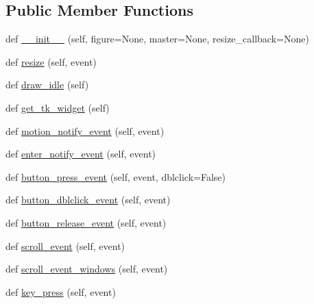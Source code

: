 \subsection*{Public Member Functions}
\begin{DoxyCompactItemize}
\item 
def \hyperlink{classmatplotlib_1_1backends_1_1__backend__tk_1_1FigureCanvasTk_ae2cd85a7d008ea96b789adccf6c6a709}{\+\_\+\+\_\+init\+\_\+\+\_\+} (self, figure=None, master=None, resize\+\_\+callback=None)
\item 
def \hyperlink{classmatplotlib_1_1backends_1_1__backend__tk_1_1FigureCanvasTk_a9f4c2310556826d7f1d155319f1de810}{resize} (self, event)
\item 
def \hyperlink{classmatplotlib_1_1backends_1_1__backend__tk_1_1FigureCanvasTk_ae705afc4985410bb8479b9b4e27f3af2}{draw\+\_\+idle} (self)
\item 
def \hyperlink{classmatplotlib_1_1backends_1_1__backend__tk_1_1FigureCanvasTk_a78ae90223d717f6291a8102b3821ad51}{get\+\_\+tk\+\_\+widget} (self)
\item 
def \hyperlink{classmatplotlib_1_1backends_1_1__backend__tk_1_1FigureCanvasTk_ad64dc92f337156f9198b036a0f6f9c77}{motion\+\_\+notify\+\_\+event} (self, event)
\item 
def \hyperlink{classmatplotlib_1_1backends_1_1__backend__tk_1_1FigureCanvasTk_aedc0d07515c4e91565bd1cb1d147cc1d}{enter\+\_\+notify\+\_\+event} (self, event)
\item 
def \hyperlink{classmatplotlib_1_1backends_1_1__backend__tk_1_1FigureCanvasTk_a3f608320e277ea3615808517a93a1176}{button\+\_\+press\+\_\+event} (self, event, dblclick=False)
\item 
def \hyperlink{classmatplotlib_1_1backends_1_1__backend__tk_1_1FigureCanvasTk_a561e6b8e46c9d65c463a38108984d31a}{button\+\_\+dblclick\+\_\+event} (self, event)
\item 
def \hyperlink{classmatplotlib_1_1backends_1_1__backend__tk_1_1FigureCanvasTk_af55a653d1c0d6efca1efe5363bea088a}{button\+\_\+release\+\_\+event} (self, event)
\item 
def \hyperlink{classmatplotlib_1_1backends_1_1__backend__tk_1_1FigureCanvasTk_a24fb9ecc83a0825f04230c041c40021e}{scroll\+\_\+event} (self, event)
\item 
def \hyperlink{classmatplotlib_1_1backends_1_1__backend__tk_1_1FigureCanvasTk_abbac1a9efcf7bf2cccbb948b16a23bba}{scroll\+\_\+event\+\_\+windows} (self, event)
\item 
def \hyperlink{classmatplotlib_1_1backends_1_1__backend__tk_1_1FigureCanvasTk_a79b81750836cb06dbaad1db3b4984d20}{key\+\_\+press} (self, event)

\end{DoxyCompactItemize}
